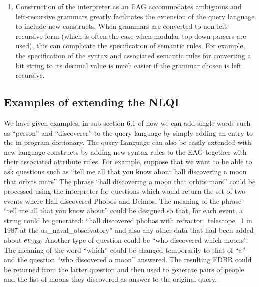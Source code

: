 \documentclass[../main.tex]{subfiles}
\begin{document}
\begin{refsection}
\begin{enumerate}
	\item Construction of the interpreter as an EAG accommodates ambiguous and left-recursive
	grammars greatly facilitates the extension of the query language to include new
	constructs. When grammars are converted to non-left-recursive
	form (which is often the case when modular top-down parsers are used), this can complicate the
	specification of semantic rules. For example, the specification of the syntax and associated
	semantic rules for converting a bit string to its decimal value is much easier if the grammar
	chosen is left recursive.
\end{enumerate}

\subsection{Examples of extending the NLQI}

We have given examples, in sub-section 6.1 of how we can add single words such as ``person'' and
``discoverer'' to the query language by simply adding an entry to the in-program dictionary.
The query Language can also be easily extended with new language constructs by adding new syntax
rules to the EAG together with their associated attribute rules. For example, suppose that we want to be able to ask questions such as ``tell me all that you
know about hall discovering a moon that orbits mars'' The phrase ``hall discovering a moon that orbits
mars'' could be processed using the interpreter for questions which would return the set of two events
where Hall discovered Phobos and Deimos. The meaning of the phrase ``tell me all that
you know about'' could be designed so that, for each event, a string could be generated: ``hall discovered phobos with refractor\_telescope\_1 in 1987 at the us\_naval\_observatory''
and also any other data that had been added about $ev_{\mathrm{1030}}$
Another type of question could be ``who discovered which moons''. The meaning of the word ``which''
could be changed temporarily to that of ``a'' and the question ``who discovered a moon'' answered. The
resulting FDBR could be returned from the latter question and then used to generate pairs of people and
the list of moons they discovered as answer to the original query.


\end{refsection}
\end{document}

